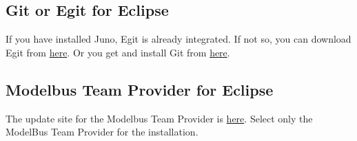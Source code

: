 \subsection{Git or Egit for Eclipse}
If you have installed Juno, Egit is already integrated. If not so, you can download Egit from \href{http://download.eclipse.org/egit/updates}{here}. Or you get and install Git from \href{http://git-scm.com/download/}{here}.
	


\subsection{Modelbus Team Provider for Eclipse}
The update site for the Modelbus Team Provider is \href{http://www.modelbus.org/modelbus/downloads/current/site}{here}. Select only the ModelBus Team Provider for the installation.



